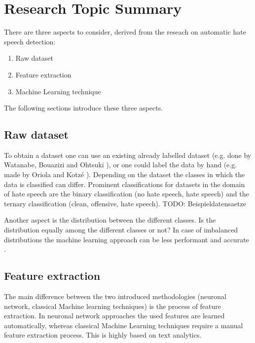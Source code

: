\section{Research Topic Summary}

There are three aspects to consider, derived from the reseach on automatic hate speech detection:
\begin{enumerate}
	\item Raw dataset
	\item Feature extraction
	\item Machine Learning technique
\end{enumerate}

\noindent
The following sections introduce these three aspects.

\subsection{Raw dataset}
To obtain a dataset one can use an existing already labelled dataset (e.g. done by Watanabe, Bouazizi and Ohtsuki \cite{8292838}), or one could label the data by hand (e.g. made by Oriola and Kotz\'{e} \cite{8963960}).
Depending on the dataset the classes in which the data is classified can differ. Prominent classifications for datasets in the domain of hate speech are the binary classification (no hate speech, hate speech) and the ternary classification (clean, offensive, hate speech). 
TODO: Beispieldatensaetze

Another aspect is the distribution between the different classes. Is the distribution equally among the different classes or not? In case of imbalanced distributions the machine learning approach can be less performant and accurate \cite{8963960}.


\subsection{Feature extraction}
The main difference between the two introduced methodologies (neuronal network, classical Machine learning techniques) is the process of feature extraction. In neuronal network approaches the used features are learned automatically, whereas classical Machine Learning techniques require a manual feature extraction process. This is highly based on text analytics.

